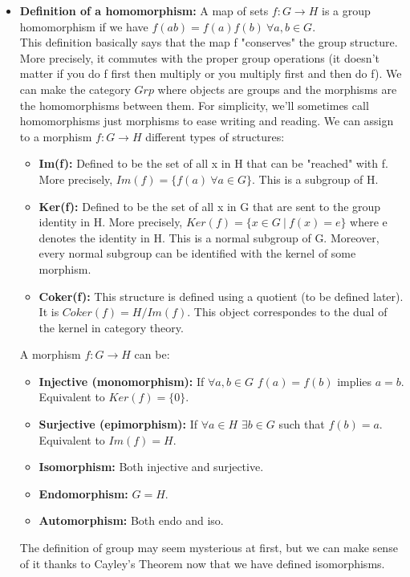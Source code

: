 \documentclass[a4paper]{article}
\begin{document}
\begin{itemize}
\item
\textbf{Definition of a homomorphism: } A map of sets $f:G\rightarrow H$ is a group homomorphism if we have $f(ab)=f(a)f(b)\ \forall a,b \in G$.\\
This definition basically says that the map f "conserves" the group structure. More precisely, it commutes with the proper group operations (it doesn't matter if you do f first then multiply or you multiply first and then do f). We can make the category $Grp$ where objects are groups and the morphisms are the homomorphisms between them. For simplicity, we'll sometimes call homomorphisms just morphisms to ease writing and reading. We can assign to a morphism $f:G\rightarrow H$ different types of structures:
\begin{itemize}
\item
\textbf{Im(f): }Defined to be the set of all x in H that can be "reached" with f. More precisely, $Im(f) = \{f(a)\ \forall a \in G\}$. This is a subgroup of H.
\item
\textbf{Ker(f): }Defined to be the set of all x in G that are sent to the group identity in H. More precisely, $Ker(f) = \{x \in G\ |\ f(x)=e \}$ where e denotes the identity in H. This is a normal subgroup of G. Moreover, every normal subgroup can be identified with the kernel of some morphism.
\item
\textbf{Coker(f): }This structure is defined using a quotient (to be defined later). It is $Coker(f) = H/Im(f)$. This object correspondes to the dual of the kernel in category theory.
\end{itemize}

A morphism $f:G\rightarrow H$ can be:
\begin{itemize}
\item
\textbf{Injective (monomorphism): }If $\forall a,b \in G$ $f(a)=f(b)$ implies $a=b$. Equivalent to $Ker(f)=\{0\}$.
\item
\textbf{Surjective (epimorphism): }If $\forall a \in H$ $\exists b \in G$ such that $f(b)=a$. Equivalent to $Im(f)=H$.
\item
\textbf{Isomorphism: }Both injective and surjective.
\item
\textbf{Endomorphism: }$G=H$.
\item
\textbf{Automorphism: }Both endo and iso.
\end{itemize}

The definition of group may seem mysterious at first, but we can make sense of it thanks to Cayley's Theorem now that we have defined isomorphisms.


\end{itemize}
\end{document}
